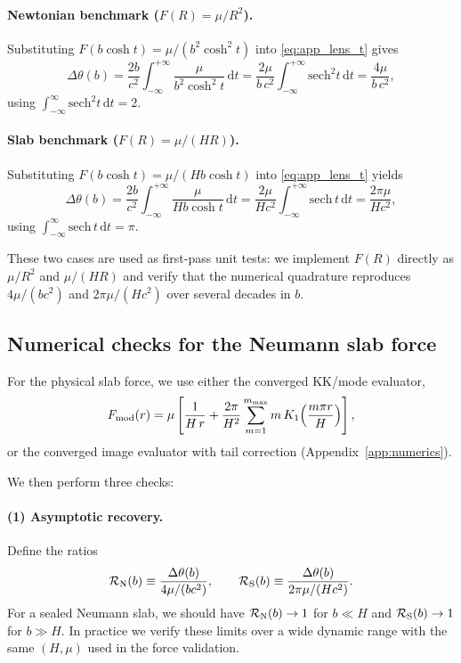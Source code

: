 \documentclass[11pt]{article}
\newcommand{\dd}{\mathrm{d}}
\begin{document}
\paragraph{Newtonian benchmark ($F(R)=\mu/R^2$).}
Substituting $F(b\cosh t)=\mu/(b^2\cosh^2 t)$ into \eqref{eq:app_lens_t} gives
\begin{equation}
  \Delta\theta(b)
  =
  \frac{2b}{c^2}\int_{-\infty}^{+\infty}\frac{\mu}{b^2\cosh^2 t}\,\dd t
  =
  \frac{2\mu}{b\,c^2}\int_{-\infty}^{+\infty}\mathrm{sech}^2 t\,\dd t
  =
  \frac{4\mu}{b\,c^2},
\end{equation}
using $\int_{-\infty}^{\infty}\mathrm{sech}^2 t\,\dd t=2$.

\paragraph{Slab benchmark ($F(R)=\mu/(H R)$).}
Substituting $F(b\cosh t)=\mu/(H b\cosh t)$ into \eqref{eq:app_lens_t} yields
\begin{equation}
  \Delta\theta(b)
  =
  \frac{2b}{c^2}\int_{-\infty}^{+\infty}\frac{\mu}{H b\cosh t}\,\dd t
  =
  \frac{2\mu}{Hc^2}\int_{-\infty}^{+\infty}\mathrm{sech}\, t\,\dd t
  =
  \frac{2\pi\mu}{Hc^2},
\end{equation}
using $\int_{-\infty}^{\infty}\mathrm{sech}\,t\,\dd t=\pi$.

These two cases are used as first-pass unit tests: we implement $F(R)$ directly as $\mu/R^2$ and
$\mu/(HR)$ and verify that the numerical quadrature reproduces $4\mu/(b c^2)$ and $2\pi\mu/(Hc^2)$
over several decades in $b$.

\subsection{Numerical checks for the Neumann slab force}

For the physical slab force, we use either the converged KK/mode evaluator,
\begin{equation}
  F_{\rm mod}(r)
  = \mu\left[
    \frac{1}{H\,r}
    +\frac{2\pi}{H^2}\sum_{m=1}^{m_{\max}} m\,K_1\!\left(\frac{m\pi r}{H}\right)
  \right],
\end{equation}
or the converged image evaluator with tail correction (Appendix~\ref{app:numerics}).

We then perform three checks:

\paragraph{(1) Asymptotic recovery.}
Define the ratios
\begin{equation}
  \mathcal{R}_{\rm N}(b)\equiv \frac{\Delta\theta(b)}{4\mu/(b c^2)},
  \qquad
  \mathcal{R}_{\rm S}(b)\equiv \frac{\Delta\theta(b)}{2\pi\mu/(Hc^2)}.
\end{equation}
For a sealed Neumann slab, we should have $\mathcal{R}_{\rm N}(b)\to 1$ for $b\ll H$ and
$\mathcal{R}_{\rm S}(b)\to 1$ for $b\gg H$.  In practice we verify these limits over a wide dynamic
range with the same $(H,\mu)$ used in the force validation.
\end{document}
